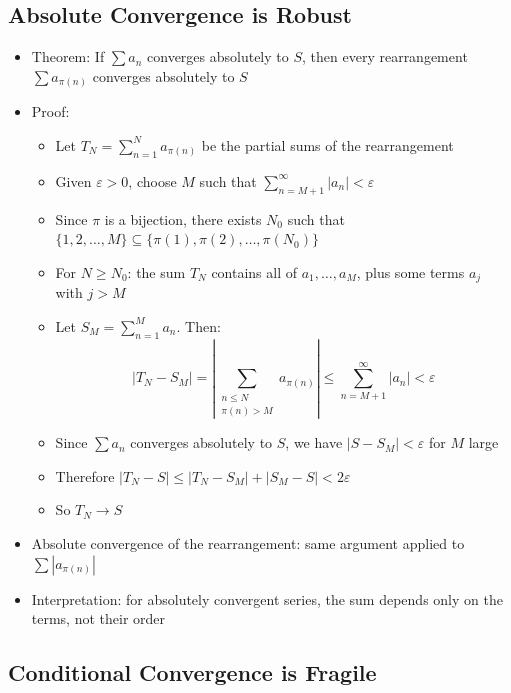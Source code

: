 \documentclass[
  10pt,
  letterpaper,
]{scrbook}
\providecommand{\tightlist}{%
  \setlength{\itemsep}{0pt}\setlength{\parskip}{0pt}}
\begin{document}
\subsection{Absolute Convergence is
Robust}\label{absolute-convergence-is-robust}

\begin{itemize}
\tightlist
\item
  Theorem: If \(\sum a_n\) converges absolutely to \(S\), then every
  rearrangement \(\sum a_{\pi(n)}\) converges absolutely to \(S\)
\item
  Proof:

  \begin{itemize}
  \tightlist
  \item
    Let \(T_N = \sum_{n=1}^{N} a_{\pi(n)}\) be the partial sums of the
    rearrangement
  \item
    Given \(\varepsilon > 0\), choose \(M\) such that
    \(\sum_{n=M+1}^{\infty} |a_n| < \varepsilon\)
  \item
    Since \(\pi\) is a bijection, there exists \(N_0\) such that
    \(\{1, 2, \ldots, M\} \subseteq \{\pi(1), \pi(2), \ldots, \pi(N_0)\}\)
  \item
    For \(N \geq N_0\): the sum \(T_N\) contains all of
    \(a_1, \ldots, a_M\), plus some terms \(a_j\) with \(j > M\)
  \item
    Let \(S_M = \sum_{n=1}^{M} a_n\). Then:
    \[|T_N - S_M| = \left| \sum_{\substack{n \leq N \\ \pi(n) > M}} a_{\pi(n)} \right| \leq \sum_{n=M+1}^{\infty} |a_n| < \varepsilon\]
  \item
    Since \(\sum a_n\) converges absolutely to \(S\), we have
    \(|S - S_M| < \varepsilon\) for \(M\) large
  \item
    Therefore \(|T_N - S| \leq |T_N - S_M| + |S_M - S| < 2\varepsilon\)
  \item
    So \(T_N \to S\)
  \end{itemize}
\item
  Absolute convergence of the rearrangement: same argument applied to
  \(\sum |a_{\pi(n)}|\)
\item
  Interpretation: for absolutely convergent series, the sum depends only
  on the terms, not their order
\end{itemize}

\subsection{Conditional Convergence is
Fragile}\label{conditional-convergence-is-fragile}
\end{document}
